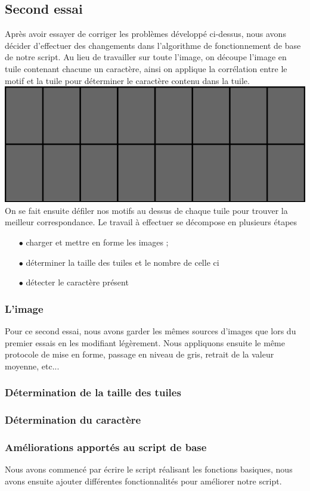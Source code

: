 \documentclass[a4paper,12pt,titlepage]{report}
\begin{document}
	\subsection{Second essai}
	Après avoir essayer de corriger les problèmes développé ci-dessus, nous avons décider d'effectuer des changements dans l’algorithme de fonctionnement de base de notre script. Au lieu de travailler sur toute l'image, on découpe l'image en tuile contenant chacune un caractère, ainsi on applique la corrélation entre le motif et la tuile pour déterminer le caractère contenu dans la tuile.
	\includegraphics[scale=0.5]{../illus/tuiles.png}
	On se fait ensuite défiler nos motifs au dessus de chaque tuile pour trouver la meilleur correspondance.
	Le travail à effectuer se décompose en plusieurs étapes
		\begin{itemize}
			\item[$\bullet$] charger et mettre en forme les images ;
			\item[$\bullet$] déterminer la taille des tuiles et le nombre de celle ci
			\item[$\bullet$] détecter le caractère présent
		\end{itemize}
	\subsubsection{L'image}
	Pour ce second essai, nous avons garder les mêmes sources d'images que lors du premier essais en les modifiant légèrement. Nous appliquons ensuite le même protocole de mise en forme, passage en niveau de gris, retrait de la valeur moyenne, etc...
	\subsubsection{Détermination de la taille des tuiles}
	\subsubsection{Détermination du caractère}
	\subsubsection{Améliorations apportés au script de base}
	Nous avons commencé par écrire le script réalisant les fonctions basiques, nous avons ensuite ajouter différentes fonctionnalités pour améliorer notre script.
\end{document}

